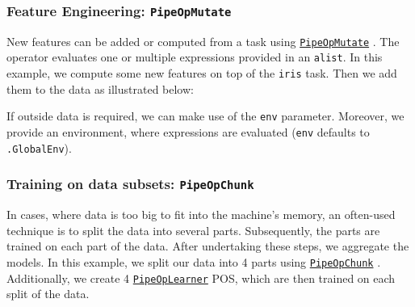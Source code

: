 \documentclass[]{article}
\newenvironment{Shaded}{\begin{snugshade}}{\end{snugshade}}
\newcommand{\CommentTok}[1]{\textcolor[rgb]{0.56,0.35,0.01}{\textit{#1}}}
\newcommand{\DataTypeTok}[1]{\textcolor[rgb]{0.13,0.29,0.53}{#1}}
\newcommand{\KeywordTok}[1]{\textcolor[rgb]{0.13,0.29,0.53}{\textbf{#1}}}
\newcommand{\NormalTok}[1]{#1}
\newcommand{\OperatorTok}[1]{\textcolor[rgb]{0.81,0.36,0.00}{\textbf{#1}}}
\newcommand{\StringTok}[1]{\textcolor[rgb]{0.31,0.60,0.02}{#1}}
\renewenvironment{Shaded} {\begin{snugshade}\small} {\end{snugshade}}
\begin{document}
\hypertarget{feature-engineering-pipeopmutate}{%
\subsubsection{\texorpdfstring{Feature Engineering: \texttt{PipeOpMutate}}{Feature Engineering: PipeOpMutate}}\label{feature-engineering-pipeopmutate}}

New features can be added or computed from a task using \href{https://mlr3pipelines.mlr-org.com/reference/mlr_pipeops_mutate.html}{\texttt{PipeOpMutate}} .
The operator evaluates one or multiple expressions provided in an \texttt{alist}.
In this example, we compute some new features on top of the \texttt{iris} task.
Then we add them to the data as illustrated below:

\begin{Shaded}
\end{Shaded}

If outside data is required, we can make use of the \texttt{env} parameter.
Moreover, we provide an environment, where expressions are evaluated (\texttt{env} defaults to \texttt{.GlobalEnv}).

\hypertarget{training-on-data-subsets-pipeopchunk}{%
\subsubsection{\texorpdfstring{Training on data subsets: \texttt{PipeOpChunk}}{Training on data subsets: PipeOpChunk}}\label{training-on-data-subsets-pipeopchunk}}

In cases, where data is too big to fit into the machine's memory, an often-used technique is to split the data into several parts.
Subsequently, the parts are trained on each part of the data.
After undertaking these steps, we aggregate the models.
In this example, we split our data into 4 parts using \href{https://mlr3pipelines.mlr-org.com/reference/mlr_pipeops_chunk.html}{\texttt{PipeOpChunk}} .
Additionally, we create 4 \href{https://mlr3pipelines.mlr-org.com/reference/mlr_pipeops_learner.html}{\texttt{PipeOpLearner}} POS, which are then trained on each split of the data.
\end{document}

